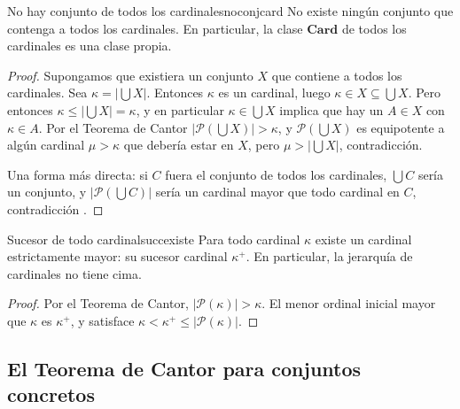 \begin{corolario}{No hay conjunto de todos los cardinales}{noconjcard}
No existe ningún conjunto que contenga a todos los cardinales. En particular, la clase $\mathbf{Card}$ de todos los cardinales es una clase propia.
\end{corolario}

\begin{proof}
Supongamos que existiera un conjunto $X$ que contiene a todos los cardinales. Sea $\kappa = |\bigcup X|$. Entonces $\kappa$ es un cardinal, luego $\kappa \in X \subseteq \bigcup X$. Pero entonces $\kappa \leq |\bigcup X| = \kappa$, y en particular $\kappa \in \bigcup X$ implica que hay un $A \in X$ con $\kappa \in A$. Por el Teorema de Cantor $|\mathcal{P}(\bigcup X)| > \kappa$, y $\mathcal{P}(\bigcup X)$ es equipotente a algún cardinal $\mu > \kappa$ que debería estar en $X$, pero $\mu > |\bigcup X|$, contradicción.

Una forma más directa: si $C$ fuera el conjunto de todos los cardinales, $\bigcup C$ sería un conjunto, y $|\mathcal{P}(\bigcup C)|$ sería un cardinal mayor que todo cardinal en $C$, contradicción \cite{jech2003}.
\end{proof}

\begin{corolario}{Sucesor de todo cardinal}{succexiste}
Para todo cardinal $\kappa$ existe un cardinal estrictamente mayor: su sucesor cardinal $\kappa^+$. En particular, la jerarquía de cardinales no tiene cima.
\end{corolario}

\begin{proof}
Por el Teorema de Cantor, $|\mathcal{P}(\kappa)| > \kappa$. El menor ordinal inicial mayor que $\kappa$ es $\kappa^+$, y satisface $\kappa < \kappa^+ \leq |\mathcal{P}(\kappa)|$.
\end{proof}

\subsection{El Teorema de Cantor para conjuntos concretos}

